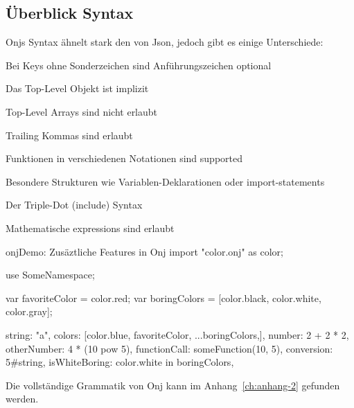
\subsection{Überblick Syntax}\label{subsec:ueberblick-syntax}

\renewcommand{\kapitelautor}{Autor: Marvin Kurka}

Onjs Syntax ähnelt stark den von Json, jedoch gibt es einige Unterschiede:
\begin{liste}
    \item Bei Keys ohne Sonderzeichen sind Anführungszeichen optional
    \item Das Top-Level Objekt ist implizit
    \item Top-Level Arrays sind nicht erlaubt
    \item Trailing Kommas sind erlaubt
    \item Funktionen in verschiedenen Notationen sind supported
    \item Besondere Strukturen wie Variablen-Deklarationen oder import-statements
    \item Der Triple-Dot (include) Syntax
    \item Mathematische expressions sind erlaubt
\end{liste}

\begin{codeBlock}{onj}{Demo: Zusäztliche Features in Onj}
import "color.onj" as color;

use SomeNamespace;

var favoriteColor = color.red;
var boringColors = [color.black, color.white, color.gray];

string: "a\nstring",
colors: [color.blue, favoriteColor, ...boringColors,],
number: 2 + 2 * 2,
otherNumber: 4 * (10 pow 5),
functionCall: someFunction(10, 5),
conversion: 5#string,
isWhiteBoring: color.white in boringColors,
\end{codeBlock}

\begin{infoBox}
Die vollständige Grammatik von Onj kann im Anhang~\ref{ch:anhang-2} gefunden werden.
\end{infoBox}

\renewcommand{\kapitelautor}{}
